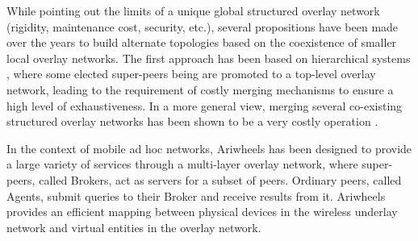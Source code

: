 



%
While pointing out the limits of a unique global structured overlay network
(rigidity, maintenance cost, security, etc.), several propositions
have been made over the years to build alternate topologies based on
the coexistence of smaller local overlay networks. The first approach
has been based on hierarchical systems \cite{Biersack,XuMH03}, where some
elected super-peers being are promoted to a top-level overlay network,
leading to the requirement of costly merging mechanisms to ensure a
high level of exhaustiveness. In a more general view, merging several
co-existing structured overlay networks has been shown to be a very
costly operation \cite{Datta,Haridi}.

In the context of mobile ad hoc networks, Ariwheels
\cite{BCCL08,LBCC08} has been designed to provide a large variety of
services through a multi-layer overlay network, where super-peers,
called Brokers, act as servers for a subset of peers.  Ordinary peers,
called Agents, submit queries to their Broker and receive results from
it. Ariwheels provides an efficient mapping between physical devices
in the wireless underlay network and virtual entities in the overlay
network.

